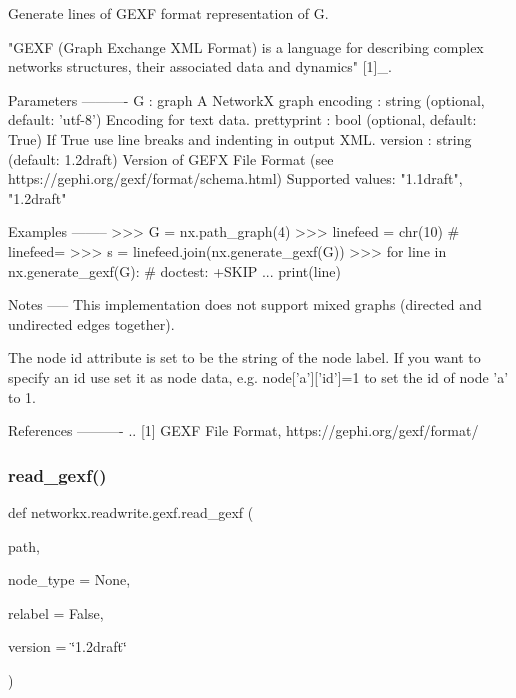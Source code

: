 \begin{DoxyVerb}Generate lines of GEXF format representation of G.

"GEXF (Graph Exchange XML Format) is a language for describing
complex networks structures, their associated data and dynamics" [1]_.

Parameters
----------
G : graph
A NetworkX graph
encoding : string (optional, default: 'utf-8')
Encoding for text data.
prettyprint : bool (optional, default: True)
If True use line breaks and indenting in output XML.
version : string (default: 1.2draft)
Version of GEFX File Format (see https://gephi.org/gexf/format/schema.html)
Supported values: "1.1draft", "1.2draft"


Examples
--------
>>> G = nx.path_graph(4)
>>> linefeed = chr(10)  # linefeed=\n
>>> s = linefeed.join(nx.generate_gexf(G))
>>> for line in nx.generate_gexf(G):  # doctest: +SKIP
...     print(line)

Notes
-----
This implementation does not support mixed graphs (directed and undirected
edges together).

The node id attribute is set to be the string of the node label.
If you want to specify an id use set it as node data, e.g.
node['a']['id']=1 to set the id of node 'a' to 1.

References
----------
.. [1] GEXF File Format, https://gephi.org/gexf/format/
\end{DoxyVerb}
 \mbox{\label{namespacenetworkx_1_1readwrite_1_1gexf_ae8f41d0374dbed8fa34b57b360c7eea7}} 
\subsubsection{\texorpdfstring{read\+\_\+gexf()}{read\_gexf()}}
{\footnotesize\ttfamily def networkx.\+readwrite.\+gexf.\+read\+\_\+gexf (\begin{DoxyParamCaption}\item[{}]{path,  }\item[{}]{node\+\_\+type = {\ttfamily None},  }\item[{}]{relabel = {\ttfamily False},  }\item[{}]{version = {\ttfamily \char`\"{}1.2draft\char`\"{}} }\end{DoxyParamCaption})}

